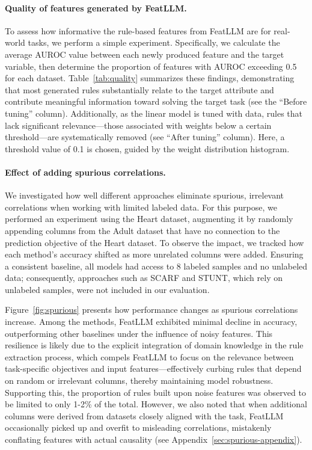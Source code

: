 \vspace*{-0.12in}
\paragraph{Quality of features generated by \textsf{FeatLLM}.}
To assess how informative the rule-based features from \textsf{FeatLLM} are for real-world tasks, we perform a simple experiment. Specifically, we calculate the average AUROC value between each newly produced feature and the target variable, then determine the proportion of features with AUROC exceeding 0.5 for each dataset. Table~\ref{tab:quality} summarizes these findings, demonstrating that most generated rules substantially relate to the target attribute and contribute meaningful information toward solving the target task (see the “Before tuning” column). Additionally, as the linear model is tuned with data, rules that lack significant relevance—those associated with weights below a certain threshold—are systematically removed (see “After tuning” column). Here, a threshold value of 0.1 is chosen, guided by the weight distribution histogram.

\vspace*{-0.12in}
\paragraph{Effect of adding spurious correlations.} We investigated how well different approaches eliminate spurious, irrelevant correlations when working with limited labeled data. For this purpose, we performed an experiment using the Heart dataset, augmenting it by randomly appending columns from the Adult dataset that have no connection to the prediction objective of the Heart dataset. To observe the impact, we tracked how each method’s accuracy shifted as more unrelated columns were added. Ensuring a consistent baseline, all models had access to 8 labeled samples and no unlabeled data; consequently, approaches such as SCARF and STUNT, which rely on unlabeled samples, were not included in our evaluation.

Figure~\ref{fig:spurious} presents how performance changes as spurious correlations increase. Among the methods, \textsf{FeatLLM} exhibited minimal decline in accuracy, outperforming other baselines under the influence of noisy features. This resilience is likely due to the explicit integration of domain knowledge in the rule extraction process, which compels \textsf{FeatLLM} to focus on the relevance between task-specific objectives and input features—effectively curbing rules that depend on random or irrelevant columns, thereby maintaining model robustness. Supporting this, the proportion of rules built upon noise features was observed to be limited to only 1-2\% of the total. However, we also noted that when additional columns were derived from datasets closely aligned with the task, \textsf{FeatLLM} occasionally picked up and overfit to misleading correlations, mistakenly conflating features with actual causality (see Appendix~\ref{sec:spurious-appendix}).

